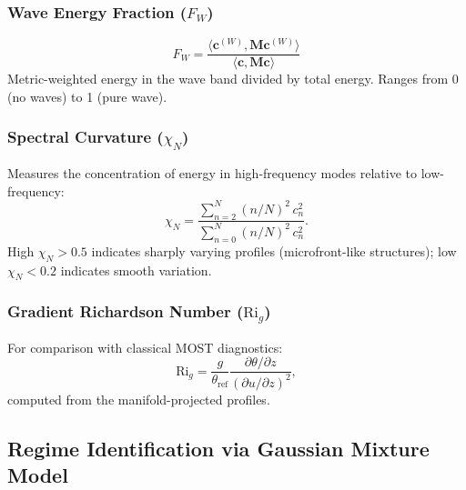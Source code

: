 \documentclass[11pt,a4paper]{article}
\begin{document}
\subsubsection{Wave Energy Fraction ($F_W$)}

\begin{equation}
F_W = \frac{\langle \mathbf{c}^{(W)}, \mathbf{M} \mathbf{c}^{(W)} \rangle}{\langle \mathbf{c}, \mathbf{M} \mathbf{c} \rangle}
\label{eq:f_w}
\end{equation}
Metric-weighted energy in the wave band divided by total energy. Ranges from 0 (no waves) to 1 (pure wave).

\subsubsection{Spectral Curvature ($\chi_N$)}

Measures the concentration of energy in high-frequency modes relative to low-frequency:
\begin{equation}
\chi_N = \frac{\sum_{n=2}^{N} (n/N)^2 \, c_n^2}{\sum_{n=0}^{N} (n/N)^2 \, c_n^2}.
\label{eq:chi_n}
\end{equation}
High $\chi_N > 0.5$ indicates sharply varying profiles (microfront-like structures); low $\chi_N < 0.2$ indicates smooth variation.

\subsubsection{Gradient Richardson Number ($\mathrm{Ri}_g$)}

For comparison with classical MOST diagnostics:
\begin{equation}
\mathrm{Ri}_g = \frac{g}{\theta_{\mathrm{ref}}} \frac{\partial \theta / \partial z}{(\partial u / \partial z)^2},
\label{eq:rif}
\end{equation}
computed from the manifold-projected profiles.

\subsection{Regime Identification via Gaussian Mixture Model}
\label{sec:methods:clustering}
\end{document}
